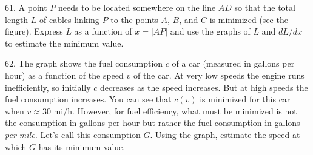 \documentclass{sebase}
\begin{document}
\begin{multicols}{2}
\begin{ExerciseList}
\item[\hfill 61.] 
\GCALCX%
A point $P$ needs to be located somewhere on the line $AD$ so that the total
length $L$ of cables linking $P$ to the points $A$, $B$, and $C$ is
minimized (see the figure). Express $L$ as a function of $x=\left\vert
AP\right\vert $ and use the graphs of $L$ and $dL/dx$ to estimate the
minimum value.\\[6pt]
\hspace*{\fill}\hspace*{\fill}

%

%

\item[\hfill 62.] The graph shows the fuel consumption $c$ of a car
(measured in gallons per hour) as a function of the speed $v$ of the car. At
very low speeds the engine runs inefficiently, so initially $c$ decreases as
the speed increases. But at high speeds the fuel consumption increases. You
can see that $c(v)$ is minimized for this car when $v\approx 30$ mi$/$h.
However, for fuel efficiency, what must be minimized is not the consumption
in gallons per hour but rather the fuel consumption in gallons \textit{per
mile.} Let's call this consumption $G$. Using the graph, estimate the speed
at which $G$ has its minimum value.\\[6pt]
\hspace*{\fill}\hspace*{\fill}


\end{ExerciseList}
\end{multicols}
\end{document}
